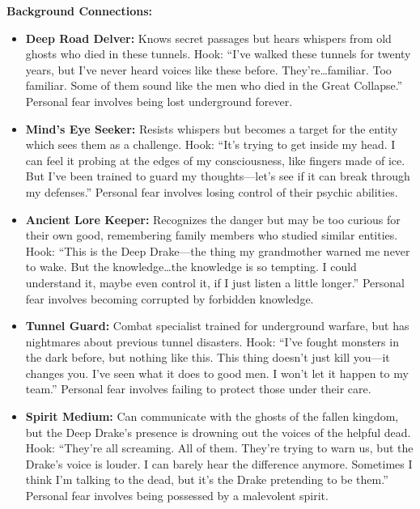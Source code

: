 \documentclass[11pt]{article}
\begin{document}
\textbf{Background Connections:}
\begin{itemize}
\item \textbf{Deep Road Delver:} Knows secret passages but hears whispers from old ghosts who died in these tunnels. Hook: ``I've walked these tunnels for twenty years, but I've never heard voices like these before. They're\dots familiar. Too familiar. Some of them sound like the men who died in the Great Collapse.'' Personal fear involves being lost underground forever.
\item \textbf{Mind's Eye Seeker:} Resists whispers but becomes a target for the entity which sees them as a challenge. Hook: ``It's trying to get inside my head. I can feel it probing at the edges of my consciousness, like fingers made of ice. But I've been trained to guard my thoughts---let's see if it can break through my defenses.'' Personal fear involves losing control of their psychic abilities.
\item \textbf{Ancient Lore Keeper:} Recognizes the danger but may be too curious for their own good, remembering family members who studied similar entities. Hook: ``This is the Deep Drake---the thing my grandmother warned me never to wake. But the knowledge\dots the knowledge is so tempting. I could understand it, maybe even control it, if I just listen a little longer.'' Personal fear involves becoming corrupted by forbidden knowledge.
\item \textbf{Tunnel Guard:} Combat specialist trained for underground warfare, but has nightmares about previous tunnel disasters. Hook: ``I've fought monsters in the dark before, but nothing like this. This thing doesn't just kill you---it changes you. I've seen what it does to good men. I won't let it happen to my team.'' Personal fear involves failing to protect those under their care.
\item \textbf{Spirit Medium:} Can communicate with the ghosts of the fallen kingdom, but the Deep Drake's presence is drowning out the voices of the helpful dead. Hook: ``They're all screaming. All of them. They're trying to warn us, but the Drake's voice is louder. I can barely hear the difference anymore. Sometimes I think I'm talking to the dead, but it's the Drake pretending to be them.'' Personal fear involves being possessed by a malevolent spirit.
\end{itemize}
\end{document}
